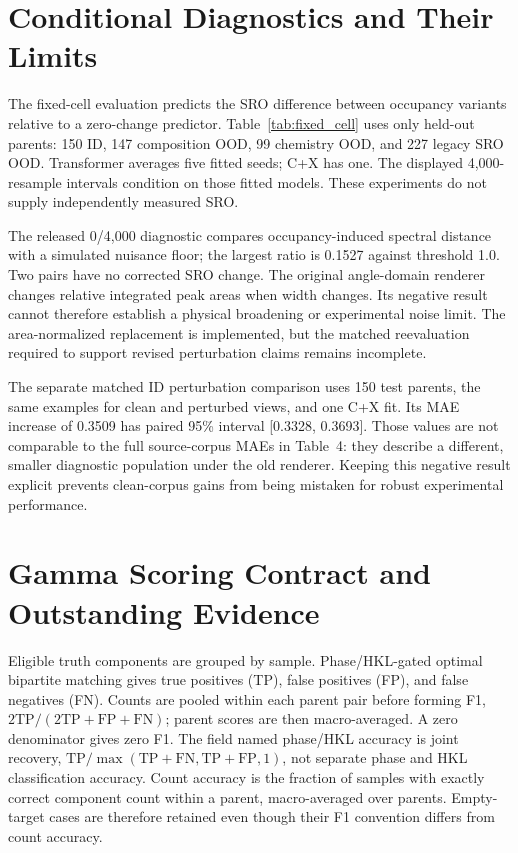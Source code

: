 \documentclass[sigconf,review,anonymous]{acmart}
\newenvironment{revision}{\ifdefined\markedcopy\color{red!70!black}\else\color{black}\fi}{}
\begin{document}
\begin{revision}
\section{Conditional Diagnostics and Their Limits}
\label{sec:diagnostics}
\begin{table}[t]
  \centering
  \caption{Fixed-cell paired-change diagnostic relative to zero change.
  Positive reduction favors the model; negative $\Delta$ MAE favors it.
  Parent-only intervals condition on fitted seeds and are pointwise.}
  \label{tab:fixed_cell}
  
\end{table}

The fixed-cell evaluation predicts the SRO difference between occupancy
variants relative to a zero-change predictor. Table~\ref{tab:fixed_cell}
uses only held-out parents: 150 ID, 147 composition OOD, 99 chemistry OOD,
and 227 legacy SRO OOD. Transformer averages five fitted seeds; C+X has
one. The displayed 4,000-resample intervals condition on those fitted
models. These experiments do not supply independently measured SRO.

The released 0/4,000 diagnostic compares occupancy-induced spectral
distance with a simulated nuisance floor; the largest ratio is 0.1527
against threshold 1.0. Two pairs have no corrected SRO change. The
original angle-domain renderer changes relative integrated peak areas
when width changes. Its negative result cannot therefore establish a
physical broadening or experimental noise limit. The area-normalized
replacement is implemented, but the matched reevaluation required to
support revised perturbation claims remains incomplete.

The separate matched ID perturbation comparison uses 150 test parents,
the same examples for clean and perturbed views, and one C+X fit. Its
MAE increase of 0.3509 has paired 95\% interval [0.3328, 0.3693]. Those
values are not comparable to the full source-corpus MAEs in Table~4:
they describe a different, smaller diagnostic population under the old
renderer. Keeping this negative result explicit prevents clean-corpus
gains from being mistaken for robust experimental performance.

\section{Gamma Scoring Contract and Outstanding Evidence}
\label{app:gamma}
Eligible truth components are grouped by sample. Phase/HKL-gated optimal
bipartite matching gives true positives (TP), false positives (FP), and
false negatives (FN). Counts are pooled within each parent pair before
forming F1, $2\mathrm{TP}/(2\mathrm{TP}+\mathrm{FP}+\mathrm{FN})$;
parent scores are then macro-averaged. A zero denominator gives zero F1.
The field named phase/HKL accuracy is joint recovery,
$\mathrm{TP}/\max(\mathrm{TP}+\mathrm{FN},\mathrm{TP}+\mathrm{FP},1)$,
not separate phase and HKL classification accuracy. Count accuracy is
the fraction of samples with exactly correct component count within a
parent, macro-averaged over parents. Empty-target cases are therefore
retained even though their F1 convention differs from count accuracy.


\end{revision}
\end{document}

